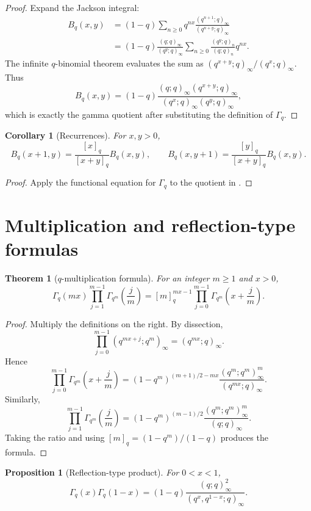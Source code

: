 \documentclass[11pt,oneside,openany]{book}
\newtheorem{theorem}{Theorem}[chapter]
\newtheorem{proposition}[proposition]{Proposition}
\newtheorem{corollary}[corollary]{Corollary}
\theoremstyle{definition}
\theoremstyle{remark}
\begin{document}
\begin{proof}
Expand the Jackson integral:
\begin{align*}
 B_q(x,y)
 &=(1-q)\sum_{n\ge0}q^{nx}
 \frac{(q^{n+1};q)_\infty}{(q^{n+y};q)_\infty}\\
 &=(1-q)\frac{(q;q)_\infty}{(q^y;q)_\infty}
 \sum_{n\ge0}\frac{(q^y;q)_n}{(q;q)_n}q^{nx}.
\end{align*}
The infinite $q$-binomial theorem evaluates the sum as
\(
 (q^{x+y};q)_\infty/(q^x;q)_\infty.
\)
Thus
\[
 B_q(x,y)
 =(1-q)\frac{(q;q)_\infty(q^{x+y};q)_\infty}
 {(q^x;q)_\infty(q^y;q)_\infty},
\]
which is exactly the gamma quotient after substituting the definition of $\Gamma_q$.
\end{proof}

\begin{corollary}[Recurrences]\label{cor:qbeta-recurrence}
For $x,y>0$,
\[
 B_q(x+1,y)=\frac{[x]_q}{[x+y]_q}B_q(x,y),
 \qquad
 B_q(x,y+1)=\frac{[y]_q}{[x+y]_q}B_q(x,y).
\]
\end{corollary}

\begin{proof}
Apply the functional equation for $\Gamma_q$ to the quotient in .
\end{proof}

\section{Multiplication and reflection-type formulas}

\begin{theorem}[$q$-multiplication formula]\label{thm:qgamma-multiplication}
For an integer $m\ge1$ and $x>0$,
\[
 \Gamma_q(mx)\prod_{j=1}^{m-1}\Gamma_{q^m}\!\left(\frac jm\right)
 =[m]_q^{mx-1}
 \prod_{j=0}^{m-1}\Gamma_{q^m}\!\left(x+\frac jm\right).
\]
\end{theorem}

\begin{proof}
Multiply the definitions on the right.  By dissection,
\[
 \prod_{j=0}^{m-1}(q^{mx+j};q^m)_\infty=(q^{mx};q)_\infty.
\]
Hence
\[
 \prod_{j=0}^{m-1}\Gamma_{q^m}\!\left(x+\frac jm\right)
 =(1-q^m)^{(m+1)/2-mx}
 \frac{(q^m;q^m)_\infty^m}{(q^{mx};q)_\infty}.
\]
Similarly,
\[
 \prod_{j=1}^{m-1}\Gamma_{q^m}\!\left(\frac jm\right)
 =(1-q^m)^{(m-1)/2}
 \frac{(q^m;q^m)_\infty^m}{(q;q)_\infty}.
\]
Taking the ratio and using
\(
 [m]_q=(1-q^m)/(1-q)
\)
produces the formula.
\end{proof}

\begin{proposition}[Reflection-type product]\label{prop:qgamma-reflection}
For $0<x<1$,
\[
 \Gamma_q(x)\Gamma_q(1-x)
 =(1-q)\frac{(q;q)_\infty^2}
 {(q^x,q^{1-x};q)_\infty}.
\]
\end{proposition}
\end{document}
